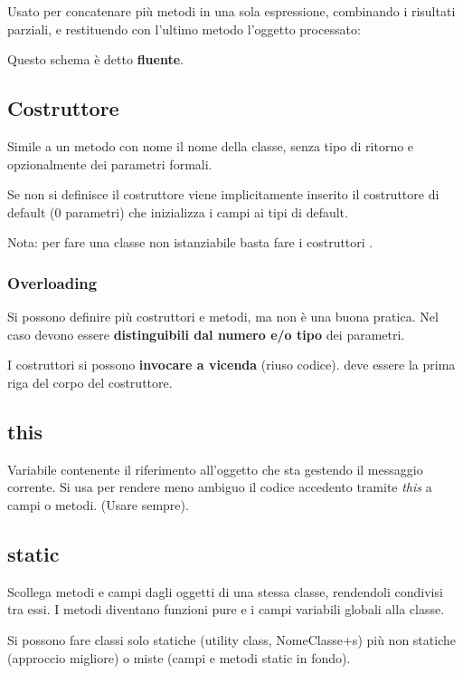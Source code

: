 Usato per concatenare più metodi in una sola espressione, combinando i risultati parziali, e restituendo con l'ultimo metodo l'oggetto processato:


Questo schema è detto \textbf{fluente}.

\subsection{Costruttore}
Simile a un metodo con nome il nome della classe, senza tipo di ritorno e opzionalmente dei parametri formali.


Se non si definisce il costruttore viene implicitamente inserito il costruttore di default (0 parametri) che inizializza i campi ai tipi di default.

Nota: per fare una classe non istanziabile basta fare i costruttori .
\subsubsection{Overloading}
Si possono definire più costruttori e metodi, ma non è una buona pratica.
Nel caso devono essere \textbf{distinguibili dal numero e/o tipo} dei parametri.

I costruttori si possono \textbf{invocare a vicenda} (riuso codice).  deve essere la prima riga del corpo del costruttore.


\subsection{this}
Variabile contenente il riferimento all'oggetto che sta gestendo il messaggio corrente. Si usa per rendere meno ambiguo il codice accedento tramite \textit{this} a campi o metodi. (Usare sempre).

\subsection{static}
Scollega metodi e campi dagli oggetti di una stessa classe, rendendoli condivisi tra essi. I metodi diventano funzioni pure e i campi variabili globali alla classe.

Si possono fare classi solo statiche (utility class, NomeClasse+s) più non statiche (approccio migliore) o miste (campi e metodi static in fondo).

